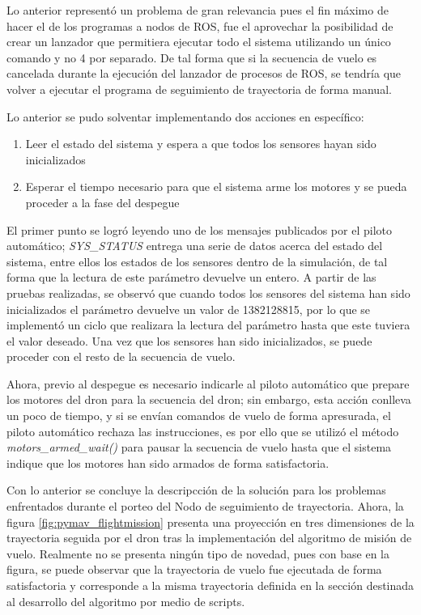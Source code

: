 Lo anterior representó un problema de gran relevancia pues el fin máximo de hacer el de los programas a nodos de ROS, fue el aprovechar la posibilidad de crear un lanzador que permitiera ejecutar todo el sistema utilizando un único comando y no 4 por separado. De tal forma que si la secuencia de vuelo es cancelada durante la ejecución del lanzador de procesos de ROS, se tendría que volver a ejecutar el programa de seguimiento de trayectoria de forma manual.

Lo anterior se pudo solventar implementando dos acciones en específico:

\begin{enumerate}
    \item Leer el estado del sistema y espera a que todos los sensores hayan sido inicializados
    \item Esperar el tiempo necesario para que el sistema arme los motores y se pueda proceder a la fase del despegue
\end{enumerate}

El primer punto se logró leyendo uno de los mensajes publicados por el piloto automático; \textit{SYS\_STATUS} entrega una serie de datos acerca del estado del sistema, entre ellos los estados de los sensores dentro de la simulación, de tal forma que la lectura de este parámetro devuelve un entero. A partir de las pruebas realizadas, se observó que cuando todos los sensores del sistema han sido inicializados el parámetro devuelve un valor de 1382128815, por lo que se implementó un ciclo que realizara la lectura del parámetro hasta que este tuviera el valor deseado. Una vez que los sensores han sido inicializados, se puede proceder con el resto de la secuencia de vuelo.

Ahora, previo al despegue es necesario indicarle al piloto automático que prepare los motores del dron para la secuencia del dron; sin embargo, esta acción conlleva un poco de tiempo, y si se envían comandos de vuelo de forma apresurada, el piloto automático rechaza las instrucciones, es por ello que se utilizó el método \textit{motors\_armed\_wait()} para pausar la secuencia de vuelo hasta que el sistema indique que los motores han sido armados de forma satisfactoria.

Con lo anterior se concluye la descripcción de la solución para los problemas enfrentados durante el porteo del Nodo de seguimiento de trayectoria. Ahora, la figura \ref{fig:pymav_flightmission} presenta una proyección en tres dimensiones de la trayectoria seguida por el dron tras la implementación del algoritmo de misión de vuelo. Realmente no se presenta ningún tipo de novedad, pues con base en la figura, se puede observar que la trayectoria de vuelo fue ejecutada de forma satisfactoria y corresponde a la misma trayectoria definida en la sección destinada al desarrollo del algoritmo por medio de scripts.


